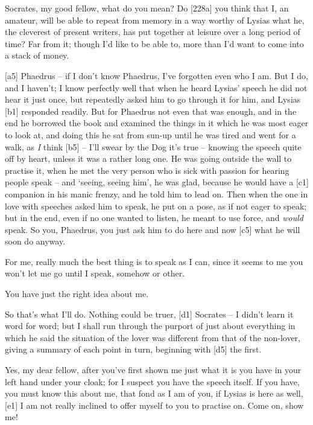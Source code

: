  Socrates, my good fellow, what do you mean? Do {[}228a{]} you
think that I, an amateur, will be able to repeat from memory in a way
worthy of Lysias what he, the cleverest of present writers, has put
together at leisure over a long period of time? Far from it; though I'd
like to be able to, more than I'd want to come into a stack of money.

{[}a5{]}  Phaedrus -- if I don't know Phaedrus, I've forgotten
even who I am. But I do, and I haven't; I know perfectly well that when
he heard Lysias' speech he did not hear it just once, but repeatedly
asked him to go through it for him, and Lysias {[}b1{]} responded
readily. But for Phaedrus not even that was enough, and in the end he
borrowed the book and examined the things in it which he was most eager
to look at, and doing this he sat from sun-up until he was tired and
went for a walk, as {\em I} think {[}b5{]} -- I'll swear by the
Dog it's true -- knowing
the speech quite off by heart, unless it was a rather long one. He was
going outside the wall to practise it, when he met the very person who
is sick with passion for hearing people
speak -- and ‘seeing,
seeing him', he was glad,
because he would have a {[}c1{]} companion in his manic frenzy, and he
told him to lead on. Then when the one in love with speeches asked him
to speak, he put on a pose, as if not eager to speak; but in the end,
even if no one wanted to listen, he meant to use force, and {\em would}
speak. So you, Phaedrus, you just ask him to do here and now {[}c5{]}
what he will soon do anyway.

 For me, really much the best thing is to speak as I can, since
it seems to me you won't let me go until I speak, somehow or other.

 You have just the right idea about me.

 So that's what I'll do. Nothing could be truer, {[}d1{]}
Socrates -- I didn't learn it word for word; but I shall run through the
purport of just about everything in which he said the situation of the
lover was different from that of the non-lover, giving a summary of each
point in turn, beginning with {[}d5{]} the first.

 Yes, my dear fellow, after you've first shown me just what it
is you have in your left hand under your cloak; for I suspect you have
the speech itself. If you have, you must know this about me, that fond
as I am of you, if Lysias is here as well, {[}e1{]} I am not really
inclined to offer myself to you to practise on. Come on, show me!

